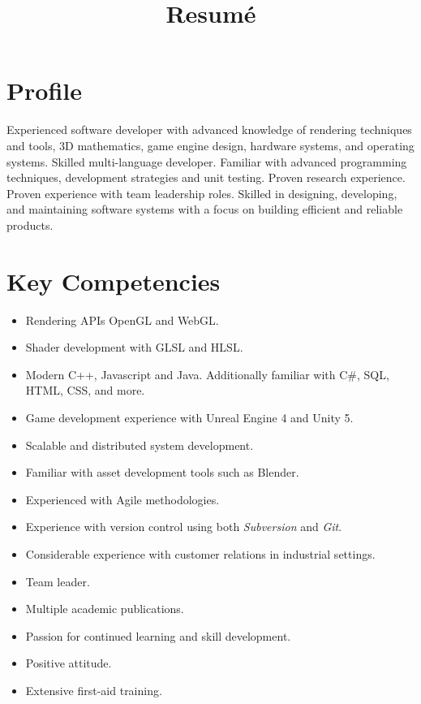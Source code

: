 \documentclass[11pt,a4paper,sans]{moderncv}        %
\title{Resumé}                               %
\begin{document}
\makecvtitle
\section{Profile}
Experienced software developer with advanced knowledge of rendering techniques and tools, 3D mathematics, game engine design, hardware systems, and operating systems. 
Skilled multi-language developer. 
Familiar with advanced programming techniques, development strategies and unit testing.
Proven research experience. 
Proven experience with team leadership roles.
Skilled in designing, developing, and maintaining software systems with a focus on building efficient and reliable products.
\section{Key Competencies}
\begin{itemize}
	\item Rendering APIs OpenGL and WebGL.
	\item Shader development with GLSL and HLSL.
	\item Modern C++, Javascript and Java. Additionally familiar with C\#, SQL, HTML, CSS, and more.
	\item Game development experience with Unreal Engine 4 and Unity 5.
	\item Scalable and distributed system development.
	\item Familiar with asset development tools such as Blender.
	\item Experienced with Agile methodologies.
	\item Experience with version control using both \textit{Subversion} and \textit{Git}.
	\item Considerable experience with customer relations in industrial settings.
	\item Team leader.
	\item Multiple academic publications.
	\item Passion for continued learning and skill development.
	\item Positive attitude.
	\item Extensive first-aid training.
\end{itemize}
\end{document}
